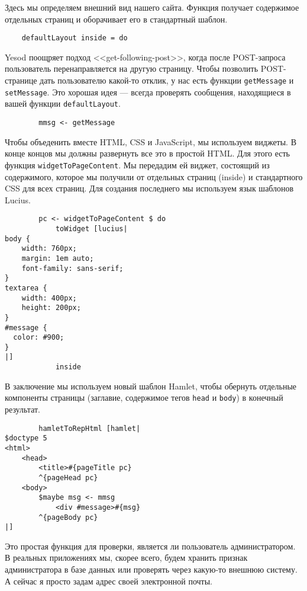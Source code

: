 Здесь мы определяем внешний вид нашего сайта. Функция получает содержимое отдельных страниц и оборачивает его в стандартный шаблон. 
 
\begin{lstlisting}
    defaultLayout inside = do
\end{lstlisting}
 
Yesod поощряет подход <<get-following-post>>, когда после POST-запроса пользователь перенаправляется на другую страницу. Чтобы позволить POST-странице дать пользователю какой-то отклик, у нас есть функции \lstinline!getMessage! и \lstinline!setMessage!. Это хорошая идея --- всегда проверять сообщения, находящиеся в вашей функции \lstinline!defaultLayout!. 
 
\begin{lstlisting}
        mmsg <- getMessage
\end{lstlisting}

Чтобы объеденить вместе HTML, CSS и JavaScript, мы используем виджеты. В конце концов мы должны развернуть все это в простой HTML. Для этого есть функция \lstinline!widgetToPageContent!. Мы передадим ей виджет, состоящий из содержимого, которое мы получили от отдельных страниц (inside) и стандартного CSS для всех страниц. Для создания последнего мы используем язык шаблонов Lucius. 
 
\begin{lstlisting}
        pc <- widgetToPageContent $ do
            toWidget [lucius|
body {
    width: 760px;
    margin: 1em auto;
    font-family: sans-serif;
}
textarea {
    width: 400px;
    height: 200px;
}
#message {
  color: #900;
}
|]
            inside
\end{lstlisting}%
 
В заключение мы используем новый шаблон Hamlet, чтобы обернуть отдельные компоненты страницы (заглавие, содержимое тегов \lstinline!head! и \lstinline!body!) в конечный результат. 
 
\begin{lstlisting}
        hamletToRepHtml [hamlet|
$doctype 5
<html>
    <head>
        <title>#{pageTitle pc}
        ^{pageHead pc}
    <body>
        $maybe msg <- mmsg
            <div #message>#{msg}
        ^{pageBody pc}
|]
\end{lstlisting}
 
Это простая функция для проверки, является ли пользователь администратором. В реальных приложениях мы, скорее всего, будем хранить признак администратора в базе данных или проверять через какую-то внешнюю систему. А сейчас я просто задам адрес своей электронной почты. 
 
